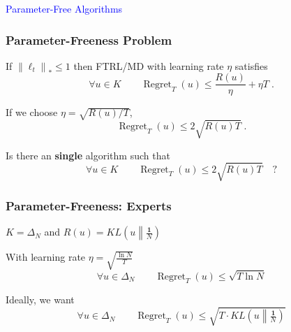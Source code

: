 \documentclass[usenames,dvipsnames]{beamer}
\DeclareMathOperator{\Regret}{Regret}
\newcommand{\norm}[1]{\left\|#1\right\|}
\newcommand{\KL}[2]{KL\left({#1}\middle\|{#2}\right)}
\begin{document}
\begin{frame}
\centering
\Huge
\textcolor{Blue}{Parameter-Free Algorithms}
\end{frame}

\begin{frame}
\frametitle{Parameter-Freeness Problem}

\begin{theorem}
If $\norm{\ell_t}_* \le 1$ then FTRL/MD with learning rate $\eta$ satisfies
$$
\forall u \in K \qquad  \Regret_T(u) \le \frac{R(u)}{\eta} + \eta T \; .
$$
\end{theorem}

\pause

\vspace{0.5cm}

If we choose $\eta = \sqrt{R(u)/T}$,
$$
\Regret_T(u) \le 2 \sqrt{R(u) T} \; .
$$

\pause

\vspace{0.5cm}

Is there an \textbf{single} algorithm such that
$$
\forall u \in K \qquad \Regret_T(u) \le 2 \sqrt{R(u) T} \quad ?
$$
\end{frame}



\begin{frame}
\frametitle{Parameter-Freeness: Experts}

$K=\Delta_N$ and $R(u) = \KL{u}{\tfrac{\textbf{1}}{N}}$

\pause
\vspace{1cm}

With learning rate $\eta = \sqrt{\frac{\ln N}{T}}$
$$
\forall u \in \Delta_N \qquad \Regret_T(u) \le \sqrt{T \ln N}
$$

\pause
\vspace{1cm}

Ideally, we want
$$
\forall u \in \Delta_N \qquad
\Regret_T(u) \le \sqrt{T \cdot \KL{u}{\tfrac{\textbf{1}}{N}}}
$$
\end{frame}
\end{document}
